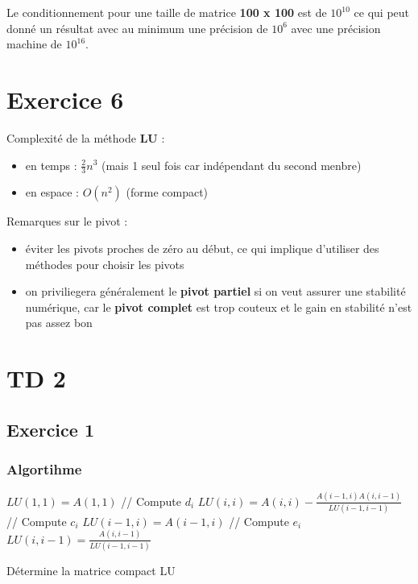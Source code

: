 \documentclass{article}
\begin{document}
Le conditionnement pour une taille de matrice \textbf{100 x 100} est
de $10^{10}$ ce qui peut donné un résultat avec au minimum une
précision de $10^{6}$ avec une précision machine de $10^{16}$.\newline

\section*{Exercice 6}

Complexité de la méthode \textbf{LU} :

\begin{itemize}
\item en temps  : $\frac{2}{3} n^3$ (mais 1 seul fois car indépendant
  du second menbre)
\item en espace : $O(n^2)$ (forme compact)
\end{itemize}

Remarques sur le pivot :

\begin{itemize}
\item éviter les pivots proches de zéro au début, ce qui implique
  d'utiliser des méthodes pour choisir les pivots
\item on priviliegera généralement le \textbf{pivot partiel} si on
  veut assurer une stabilité numérique, car le \textbf{pivot complet}
  est trop couteux et le gain en stabilité n'est pas assez bon
\end{itemize}

\section*{TD 2}

\subsection*{Exercice 1}

\subsubsection*{Algortihme}

\begin{algorithm} [H]
  \SetAlgoLined
  
  $LU(1, 1) = A(1, 1)$\;
   {
    // Compute $d_i$\;
    $LU(i, i) = A(i, i) - \frac{A(i-1, i) A(i, i-1)}{LU(i-1,
      i-1)}$\;
    // Compute $c_i$\;
    $LU(i-1, i) = A(i-1, i)$\;
    // Compute $e_i$\;
    $LU(i, i-1) = \frac{A(i, i-1)}{LU(i-1, i-1)}$\;
  }

  \caption{Détermine la matrice compact LU}
\end{algorithm}
\end{document}
